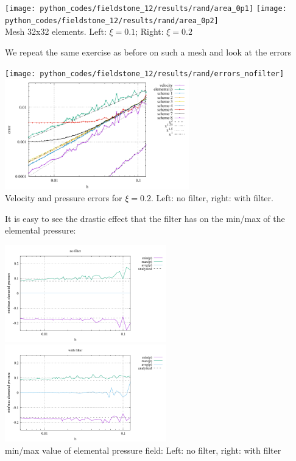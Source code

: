 \begin{center}
\texttt{[image: python\_codes/fieldstone\_12/results/rand/area\_0p1]}
\texttt{[image: python\_codes/fieldstone\_12/results/rand/area\_0p2]}\\
{\captionfont Mesh 32x32 elements. Left: $\xi=0.1$; Right: $\xi=0.2$}
\end{center}

We repeat the same exercise as before on such a mesh and look at the errors

\begin{center}
\texttt{[image: python\_codes/fieldstone\_12/results/rand/errors\_nofilter]}
\includegraphics[width=8cm]{python_codes/fieldstone_12/results/rand/errors_filter}\\
{\captionfont Velocity and pressure errors for $\xi=0.2$. Left: no filter, right: with filter.} 
\end{center}

It is easy to see the drastic effect that the filter has on the min/max of the elemental pressure:
\begin{center}
\includegraphics[width=7cm]{python_codes/fieldstone_12/results/rand/rawp_nofilter}
\includegraphics[width=7cm]{python_codes/fieldstone_12/results/rand/rawp_filter}\\
{\captionfont min/max value of elemental pressure field: Left: no filter, right: with filter}
\end{center}


